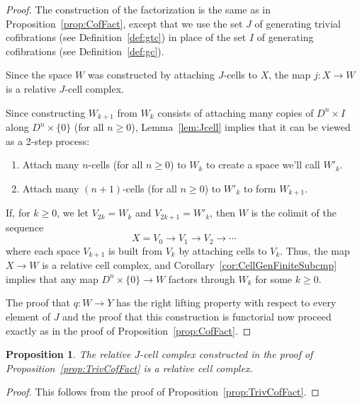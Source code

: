 \documentclass[12pt]{amsart}
\numberwithin{equation}{section}
\theoremstyle{slplain}
\newtheorem{prop}[equation]{Proposition}
\theoremstyle{definition}
\theoremstyle{remark}
\newcommand{\propref}{Proposition~\ref}
\newcommand{\lemref}{Lemma~\ref}
\newcommand{\defref}{Definition~\ref}
\begin{document}
\begin{proof}
  The construction of the factorization is the same as in
  \propref{prop:CofFact}, except that we use the set $J$ of generating
  trivial cofibrations (see \defref{def:gtc}) in place of the set $I$
  of generating cofibrations (see \defref{def:gc}).

  Since the space $W$ was constructed by attaching $J$-cells to $X$,
  the map $j\colon X \to W$ is a relative $J$-cell complex.

  Since constructing $W_{k+1}$ from $W_{k}$ consists of attaching many
  copies of $D^{n}\times I$ along $D^{n}\times\{0\}$ (for all $n \ge
  0$), \lemref{lem:Jcell} implies that it can be viewed as a 2-step
  process:
  \begin{enumerate}
  \item Attach many $n$-cells (for all $n \ge 0$) to $W_{k}$ to create
    a space we'll call $W'_{k}$.
  \item Attach many $(n+1)$-cells (for all $n \ge 0$) to $W'_{k}$ to
    form $W_{k+1}$.
  \end{enumerate}
  If, for $k \ge 0$, we let $V_{2k} = W_{k}$ and $V_{2k+1} = W'_{k}$,
  then $W$ is the colimit of the sequence
  \begin{displaymath}
    X = V_{0} \to V_{1} \to V_{2} \to \cdots
  \end{displaymath}
  where each space $V_{k+1}$ is built from $V_{k}$ by attaching cells
  to $V_{k}$.  Thus, the map $X \to W$ is a relative cell complex, and
  Corollary~\ref{cor:CellGenFiniteSubcmp} implies that any map
  $D^{n}\times\{0\} \to W$ factors through $W_{k}$ for some $k \ge
  0$.

  The proof that $q\colon W \to Y$ has the right lifting property with
  respect to every element of $J$ and the proof that this construction
  is functorial now proceed exactly as in the proof of
  \propref{prop:CofFact}.
\end{proof}


\begin{prop}
  \label{prop:JclClCmp}
  The relative $J$-cell complex constructed in the proof of
  \propref{prop:TrivCofFact} is a relative cell complex.
\end{prop}

\begin{proof}
  This follows from the proof of \propref{prop:TrivCofFact}.
\end{proof}


\end{document}
